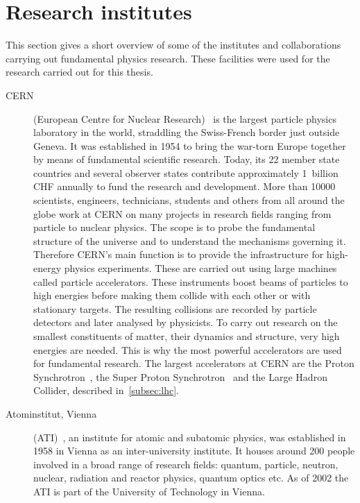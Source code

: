 \section{Research institutes}
This section gives a short overview of some of the institutes and collaborations carrying out fundamental physics research. These facilities were used for the research carried out for this thesis. 


\begin{description}
\item[CERN] (European Centre for Nuclear Research)~\cite{CERN:00000} is the largest particle physics laboratory in the world, straddling the Swiss-French border just outside Geneva. It was established in 1954 to bring the war-torn Europe together by means of fundamental scientific research. Today, its 22 member state countries and several observer states contribute approximately 1~billion CHF annually to fund the research and development. More than 10000 scientists, engineers, technicians, students and others from all around the globe work at CERN on many projects in research fields ranging from particle to nuclear physics. The scope is to probe the fundamental structure of the universe and to understand the mechanisms governing it. Therefore CERN's main function is to provide the infrastructure for high-energy physics experiments. These are carried out using large machines called particle accelerators. These instruments boost beams of particles to high energies before making them collide with each other or with stationary targets. The resulting collisions are recorded by particle detectors and later analysed by physicists. To carry out research on the smallest constituents of matter, their dynamics and structure, very high energies are needed. This is why the most powerful accelerators are used for fundamental research. The largest accelerators at CERN are the Proton Synchrotron~\cite{}, the Super Proton Synchrotron~\cite{Mills:133232} and the Large Hadron Collider, described in~\ref{subsec:lhc}.



\item[Atominstitut, Vienna] (ATI)~\cite{AtomInst:00000}, an institute for atomic and subatomic physics, was established in 1958 in Vienna as an inter-university institute. It houses around 200 people involved in a broad range of research fields: quantum, particle, neutron, nuclear, radiation and reactor physics, quantum optics etc. As of 2002 the ATI is part of the University of Technology in Vienna.


\end{description}

